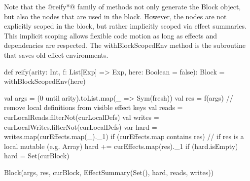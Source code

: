 Note that the @reify*@ family of methods not only generate the Block object, but also the nodes that are
used in the block. However, the nodes are not explicitly scoped in the block, but rather implicitly
scoped via effect summaries. This implicit scoping allows flexible code motion as long as effects and dependencies
are respected.
The withBlockScopedEnv method is the subroutine that saves old effect environments.

\begin{listing}[scala]
def reify(arity: Int, f: List[Exp] => Exp, here: Boolean = false): Block =
withBlockScopedEnv(here){
    val args = (0 until arity).toList.map(_ => Sym(fresh))
    val res = f(args)
    // remove local definitions from visible effect keys
    val reads = curLocalReads.filterNot(curLocalDefs)
    val writes = curLocalWrites.filterNot(curLocalDefs)
    var hard = writes.map(curEffects.map(_)._1)
    if (curEffects.map contains res) // if res is a local mutable (e.g. Array)
      hard += curEffects.map(res)._1
    if (hard.isEmpty)
      hard = Set(curBlock)

    Block(args, res, curBlock, EffectSummary(Set(), hard, reads, writes))
}
\end{listing}

